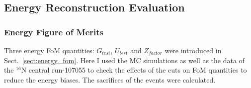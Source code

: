 
\subsection{Energy Reconstruction Evaluation}
\subsubsection{Energy Figure of Merits}\label{sect:energy_fomTest}
Three energy FoM quantities: $G_{test}$, $U_{test}$ and $Z_{factor}$ were introduced in Sect.~\ref{sect:energy_fom}.
Here I used the MC simulations as well as the data of the $^{16}$N central run-107055 to check the effects of the cuts on FoM quantities to　reduce the energy biases. The sacrifices of the events were calculated. 


